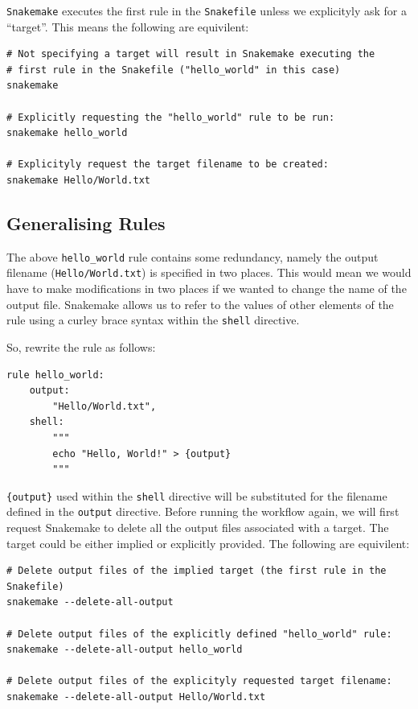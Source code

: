 \begin{steps}

\texttt{Snakemake} executes the first rule in the \texttt{Snakefile} unless we explicityly ask for a ``target''. This means the following are equivilent:

\begin{lstlisting}
# Not specifying a target will result in Snakemake executing the
# first rule in the Snakefile ("hello_world" in this case)
snakemake

# Explicitly requesting the "hello_world" rule to be run:
snakemake hello_world

# Explicityly request the target filename to be created:
snakemake Hello/World.txt
\end{lstlisting}

\subsection{Generalising Rules}

The above \texttt{hello\_world} rule contains some redundancy, namely the output filename (\texttt{Hello/World.txt}) is specified in two places. This would mean we would
have to make modifications in two places if we wanted to change the name of the output file. Snakemake allows us to refer to the values of other elements of the rule
using a curley brace syntax within the \texttt{shell} directive.

So, rewrite the rule as follows:

\begin{lstlisting}
rule hello_world:
	output:
		"Hello/World.txt",
	shell:
		"""
		echo "Hello, World!" > {output}
		"""
\end{lstlisting}

\texttt{\{output\}} used within the \texttt{shell} directive will be substituted for the filename defined in the \texttt{output} directive. Before
running the workflow again, we will first request Snakemake to delete all the output files associated with a target. The target could be either implied
or explicitly provided. The following are equivilent:

\begin{lstlisting}
# Delete output files of the implied target (the first rule in the Snakefile)
snakemake --delete-all-output

# Delete output files of the explicitly defined "hello_world" rule:
snakemake --delete-all-output hello_world

# Delete output files of the explicityly requested target filename:
snakemake --delete-all-output Hello/World.txt
\end{lstlisting}

\end{steps}

